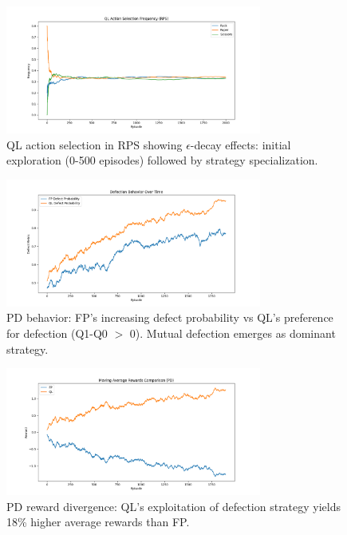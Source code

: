 \documentclass{article}
\begin{document}
\begin{figure}[H]
\centering
\includegraphics[width=0.75\textwidth]{rps_ql_strategy.png}
\caption{QL action selection in RPS showing $\epsilon$-decay effects: initial exploration (0-500 episodes) followed by strategy specialization.}
\label{fig:ql_strat}
\end{figure}

\begin{figure}[H]
\centering
\includegraphics[width=0.75\textwidth]{pd_behavior.png}
\caption{PD behavior: FP's increasing defect probability vs QL's preference for defection (Q1-Q0 $>$ 0). Mutual defection emerges as dominant strategy.}
\label{fig:pd_behavior}
\end{figure}

\begin{figure}[H]
\centering
\includegraphics[width=0.75\textwidth]{pd_rewards.png}
\caption{PD reward divergence: QL's exploitation of defection strategy yields 18\% higher average rewards than FP.}
\label{fig:pd_rewards}
\end{figure}
\end{document}
